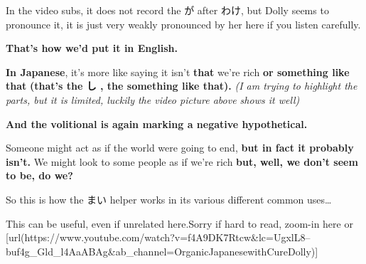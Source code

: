 In the video subs, it does not record the が after わけ, but Dolly seems to pronounce it, it is just very weakly pronounced by her here if you listen carefully.

{\bf That's how we'd put it in English.}

{\bf In Japanese}, it's more like saying it isn't {\bf that} we're rich {\bf or something like that} {\bf (that's the し , the something like that).} {\em (I am trying to highlight the parts, but it is limited, luckily the video picture above shows it well)}

{\bf And the volitional is again marking a negative hypothetical.}

Someone might act as if the world were going to end, {\bf but in fact it probably isn't.} We might look to some people as if we're rich {\bf but, well, we don't seem to be, do we?}

So this is how the まい helper works in its various different common uses\ldots{}

This can be useful, even if unrelated here.Sorry if hard to read, zoom-in here or [url(https://www.youtube.com/watch?v=f4A9DK7Rtcw&lc=UgxlL8--buf4g_Gld_l4AaABAg&ab_channel=OrganicJapanesewithCureDolly)]\crlf
{}

\stopsectionlevel

\stopsectionlevel

\stopsectionlevel

